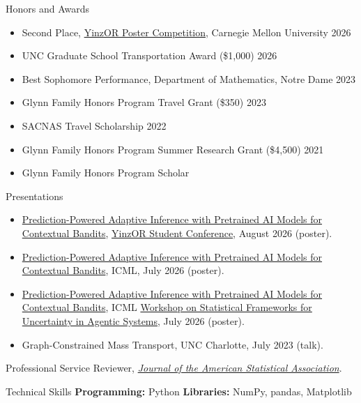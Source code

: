 \documentclass{resume}
\begin{document}
\begin{rSection}{Honors and Awards}
\begin{itemize}[leftmargin=*,nosep]
\item Second Place, \href{https://yinzor.cmuinforms.org/poster_competition/index.html}{YinzOR Poster Competition}, Carnegie Mellon University \hfill 2026
\item UNC Graduate School Transportation Award (\$1,000) \hfill 2026
\item Best Sophomore Performance, Department of Mathematics, Notre Dame \hfill 2023
\item Glynn Family Honors Program Travel Grant (\$350) \hfill 2023
\item SACNAS Travel Scholarship \hfill 2022
\item Glynn Family Honors Program Summer Research Grant (\$4,500) \hfill 2021
\item Glynn Family Honors Program Scholar
\end{itemize}
\end{rSection}
\newpage
\begin{rSection}{Presentations}
\begin{itemize}[leftmargin=*,nosep]
\item \href{https://yinzor.cmuinforms.org/}{Prediction-Powered Adaptive Inference with Pretrained AI Models for Contextual Bandits}, \href{https://yinzor.cmuinforms.org/}{YinzOR Student Conference}, August 2026 (poster).
\item \href{https://proceedings.mlr.press/v306/sargent26a.html}{Prediction-Powered Adaptive Inference with Pretrained AI Models for Contextual Bandits}, ICML, July 2026 (poster).
\item \href{https://agentic-uncertainty-icml2026.github.io/}{Prediction-Powered Adaptive Inference with Pretrained AI Models for Contextual Bandits}, ICML \href{https://agentic-uncertainty-icml2026.github.io/}{Workshop on Statistical Frameworks for Uncertainty in Agentic Systems}, July 2026 (poster).
\item Graph-Constrained Mass Transport, UNC Charlotte, July 2023 (talk).
\end{itemize}
\end{rSection}
\begin{rSection}{Professional Service}
Reviewer, \href{https://www.tandfonline.com/journals/uasa20}{\emph{Journal of the American Statistical Association}}.
\end{rSection}
\begin{rSection}{Technical Skills}
\textbf{Programming:} Python \quad \textbf{Libraries:} NumPy, pandas, Matplotlib
\end{rSection}
\end{document}
